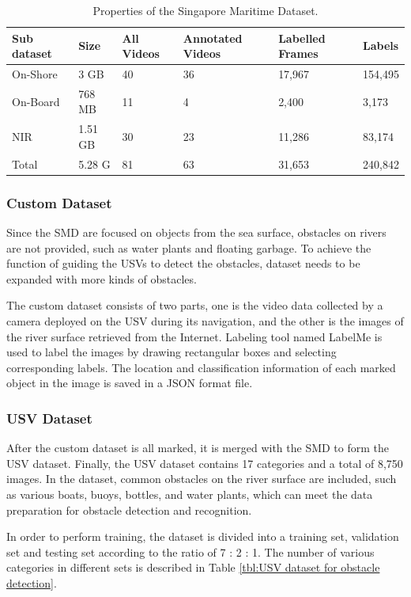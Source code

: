 \documentclass[sensors,article,submit,moreauthors,pdftex]{Definitions/mdpi}
\begin{document}
\begin{paracol}{2}
\begin{table}[htbp]
\centering
\caption{Properties of the Singapore Maritime Dataset.}
\begin{tabular}{llllll} 
\toprule
\textbf{Sub dataset}&\textbf{Size}&\textbf{All Videos}&\textbf{Annotated Videos}&\textbf{Labelled Frames}& \textbf{Labels}\\
\midrule
On-Shore & 3 GB& 40 & 36 & 17,967& 154,495\\
On-Board & 768 MB&  11 &4 &2,400& 3,173\\
NIR& 1.51 GB&  30&23 & 11,286& 83,174\\
\cmidrule(r){1-6}
Total& 5.28 G&  81 &63 & 31,653 &240,842\\
\bottomrule
\end{tabular}
\label{tbl:Properties of Singapore Maritime Dataset}
\end{table}


\subsubsection{Custom Dataset}

Since the SMD are focused on objects from the sea surface, obstacles on rivers are not provided, such as water plants and floating garbage. To achieve the function of guiding the USVs to detect the obstacles, dataset needs to be expanded with more kinds of obstacles.

The custom dataset consists of two parts, one is the video data collected by a camera deployed on the USV during its navigation, and the other is the images of the river surface retrieved from the Internet. Labeling tool named LabelMe is used to label the images by drawing rectangular boxes and selecting corresponding labels. The location and classification information of each marked object in the image is saved in a JSON format file. 

\subsubsection{USV Dataset}
After the custom dataset is all marked, it is merged with the SMD to form the USV dataset. Finally, the USV dataset contains 17 categories and a total of 8,750 images. In the dataset, common obstacles on the river surface are included, such as various boats, buoys, bottles, and water plants, which can meet the data preparation for obstacle detection and recognition.

In order to perform training, the dataset is divided into a training set, validation set and testing set according to the ratio of 7 : 2 : 1. The number of various categories in different sets is described in Table \ref{tbl:USV dataset for obstacle detection}.


\end{paracol}
\end{document}
